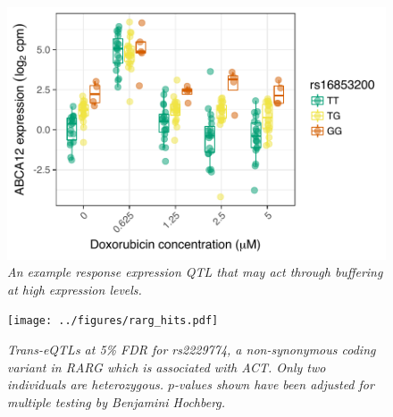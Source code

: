 \documentclass{article}
\begin{document}
\begin{figure}[h]
\begin{center}
    \includegraphics[width=.6\textwidth]{../figures/ABCA12.pdf} %
    \caption{\it{An example response expression QTL that may act through buffering at high expression levels.}}
    \label{fig:ABCA12}
    \end{center}
\end{figure}


\begin{figure}[h]
\begin{center}
    \texttt{[image: ../figures/rarg\_hits.pdf]} 
    \caption{\it{Trans-eQTLs at 5\% FDR for rs2229774, a non-synonymous coding variant in \emph{RARG} which is associated with ACT\cite{Aminkeng2015}. Only two individuals are heterozygous. $p$-values shown have been adjusted for multiple testing by Benjamini Hochberg.}}
    \label{fig:rarg_hits}
    \end{center}
\end{figure}
\end{document}
